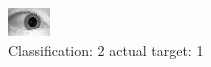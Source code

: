 \begin{figure}[h!]
\begin{center}
\includegraphics[width=0.60\columnwidth]{figures/ID1594_class_2_target_1.png}
\end{center}
\caption{ Classification: 2 actual target: 1}
\label{fig:ID1594_class_2_target_1}
\end{figure}
